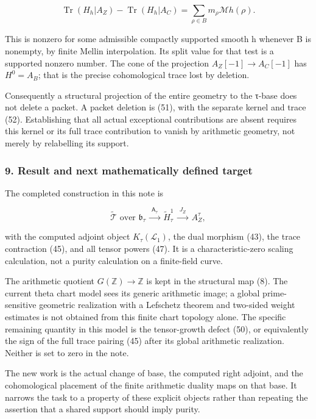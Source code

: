 \documentclass{article}
\begin{document}
\[
\operatorname{Tr}(H_h|A_Z)-\operatorname{Tr}(H_h|A_C)
=\sum_{\rho\in B}m_\rho\mathcal Mh(\rho).
\tag{52}
\]

This is nonzero for some admissible compactly supported smooth h whenever B is nonempty, by finite Mellin interpolation. Its split value for that test is a supported nonzero number. The cone of the projection \(A_Z[-1]\to A_C[-1]\) has \(H^0=A_B\); that is the precise cohomological trace lost by deletion.

Consequently a structural projection of the entire geometry to the τ-base does not delete a packet. A packet deletion is (51), with the separate kernel and trace (52). Establishing that all actual exceptional contributions are absent requires this kernel or its full trace contribution to vanish by arithmetic geometry, not merely by relabelling its support.

\subsubsection{9. Result and next mathematically defined target}\label{endpoint-tau_base--result-and-next-mathematically-defined-target}

The completed construction in this note is

\[
\widetilde{\mathcal T}\text{ over }\mathfrak b_\tau
\ \xrightarrow{\ \mathsf A_\tau\ }\
\widetilde H^1_\tau
\ \xrightarrow{\ J_Z\ }\
A_Z^\tau,
\]

with the computed adjoint object \(K_\tau(\mathcal L_1)\), the dual morphism (43), the trace contraction (45), and all tensor powers (47). It is a characteristic-zero scaling calculation, not a purity calculation on a finite-field curve.

The arithmetic quotient \(G(\mathbb Z)\to\mathbb Z\) is kept in the structural map (8). The current theta chart model sees its generic arithmetic image; a global prime-sensitive geometric realization with a Lefschetz theorem and two-sided weight estimates is not obtained from this finite chart topology alone. The specific remaining quantity in this model is the tensor-growth defect (50), or equivalently the sign of the full trace pairing (45) after its global arithmetic realization. Neither is set to zero in the note.

The new work is the actual change of base, the computed right adjoint, and the cohomological placement of the finite arithmetic duality maps on that base. It narrows the task to a property of these explicit objects rather than repeating the assertion that a shared support should imply purity.
\end{document}
